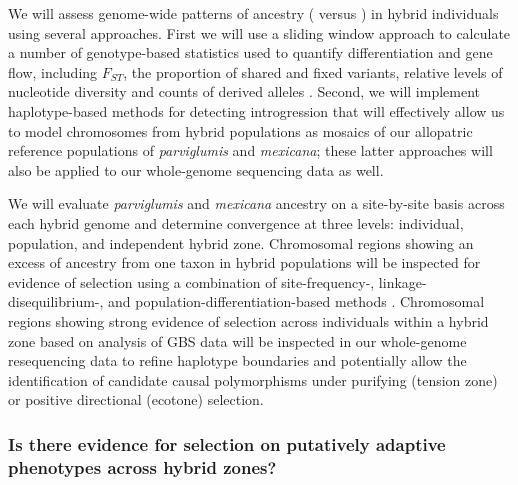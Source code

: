 We will assess genome-wide patterns of ancestry (\zp{} versus \zm{}) in hybrid individuals using several approaches.  
First we will use a sliding window approach to calculate a number of genotype-based statistics used to quantify differentiation and gene flow, including  $F_{ST}$, the proportion of shared and fixed variants, relative levels of nucleotide diversity \citep{Geneva2014} and counts of derived alleles \citep{martin2015evaluating}.
Second, we will implement haplotype-based methods for detecting introgression \citep[\emph{e.g.},][]{price2009, lawson2012} that will effectively allow us to model chromosomes from hybrid populations as mosaics of our allopatric reference populations of \emph{parviglumis} and \emph{mexicana}; these latter approaches will also be applied to our whole-genome sequencing data as well. 

We will evaluate \emph{parviglumis} and \emph{mexicana} ancestry on a site-by-site basis across each hybrid genome and determine convergence at three levels: individual, population, and independent hybrid zone.  
Chromosomal regions showing an excess of ancestry from one taxon in hybrid populations will be inspected for evidence of selection using a combination of site-frequency-, linkage-disequilibrium-, and population-differentiation-based methods \citep[reviewed in][]{Vitti2013}.
Chromosomal regions showing strong evidence of selection across individuals within a hybrid zone based on analysis of GBS data will be inspected in our whole-genome resequencing data to refine haplotype boundaries and potentially allow the identification of candidate causal polymorphisms under purifying (tension zone) or positive directional (ecotone) selection.

\subsubsection{Is there evidence for selection on putatively adaptive phenotypes across hybrid zones?}
\label{sss:driftsel}

